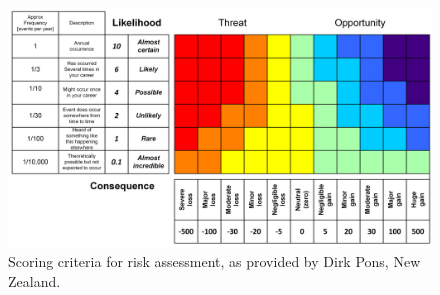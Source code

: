 \documentclass[conference]{IEEEtran}
\begin{document}
\begin{figure}[H]
\centering
\includegraphics[width=\linewidth]{risk_map_scoring.png}
\caption{\label{fig:risk-score}Scoring criteria for risk assessment, as provided by Dirk Pons, New Zealand\cite{risk-scoring-template}.}
\end{figure}
\end{document}
